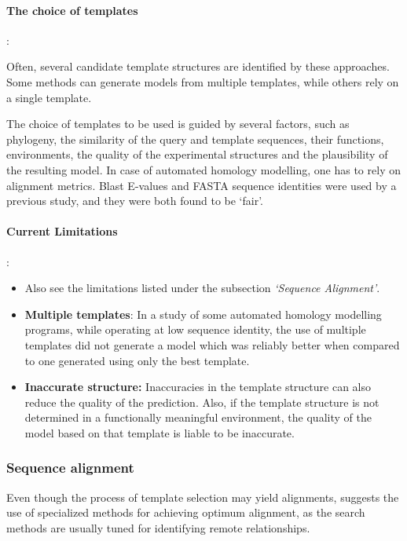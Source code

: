 \documentclass[10pt]{report}
\begin{document}
\paragraph{The choice of templates}:

Often, several candidate template structures are identified by these approaches. Some methods can generate models from multiple templates, while others rely on a single template.

The choice of templates to be used is guided by several factors, such as phylogeny, the similarity of the query and template sequences, their functions, environments, the quality of the experimental structures and the plausibility of the resulting model. In case of automated homology modelling, one has to rely on alignment metrics. Blast E-values and FASTA sequence identities were used by a previous study, and they were both found to be `fair'.\cite{dalton07} 

\paragraph{Current Limitations}: 

\begin{itemize}

\item Also see the limitations listed under the subsection \textit{`Sequence Alignment'}.

\item \textbf{Multiple templates}: In a study of some automated homology modelling programs, while operating at low sequence identity, the use of multiple templates did not generate a model which was reliably better when compared to one generated using only the best template.\cite{dalton07}

\item \textbf{Inaccurate structure:} Inaccuracies in the template structure can also reduce the quality of the prediction. Also, if the template structure is not determined in a functionally meaningful environment, the quality of the model based on that template is liable to be inaccurate. \cite{marti-renom2000com}

\end{itemize}


\subsubsection{Sequence alignment}

Even though the process of template selection may yield alignments, \cite{marti-renom2000com} suggests the use of specialized methods for achieving optimum alignment, as the search methods are usually tuned for identifying remote relationships.
\end{document}
